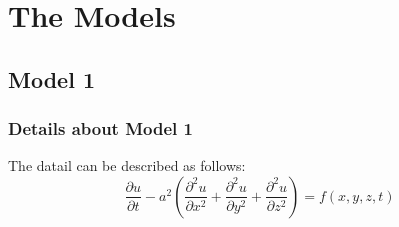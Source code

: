 \section{The Models}

\subsection{Model 1}

\subsubsection{Details about Model 1}

The datail can be described as follows:
\begin{equation}
  \frac{\partial u}{\partial t}-a^2\left(\frac{\partial^2 u}{\partial x^2}+\frac{\partial^2 u}{\partial y^2}+\frac{\partial^2 u}{\partial z^2}\right)=f(x, y, z, t)
\end{equation}
